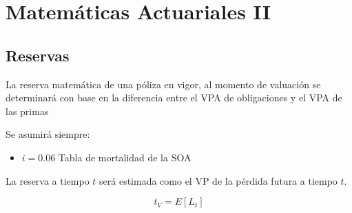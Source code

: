 \documentclass[12pt, a4paper, footinclude=true]{scrbook}
\begin{document}
\chapter{Matemáticas Actuariales II}

\section{Reservas}

La reserva matemática de una póliza en vigor, al momento de valuación se determinará con base en la diferencia entre el VPA de obligaciones y el VPA de las primas

Se asumirá siempre: 

\begin{itemize}
	\item $i = 0.06$ Tabla de mortalidad de la SOA
\end{itemize}

La reserva a tiempo $t$ será estimada como el VP de la pérdida futura a tiempo $t$. 

$$t_V = E[L_t]$$
\end{document}
